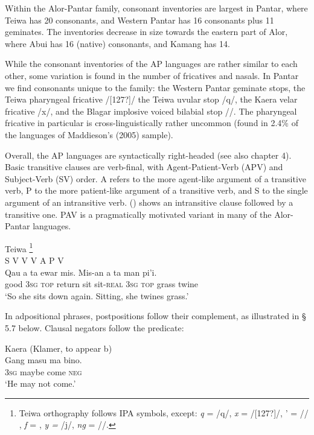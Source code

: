 Within the Alor-Pantar family, consonant inventories are largest in Pantar, where Teiwa has 20 consonants, and Western Pantar has 16 consonants plus 11 geminates. The inventories decrease in size towards the eastern part of Alor, where Abui has 16 (native) consonants, and Kamang has 14.

While the consonant inventories of the AP languages are rather similar to each other, some variation is found in the number of fricatives and nasals. In Pantar we find consonants unique to the family: the Western Pantar geminate stops, the Teiwa pharyngeal fricative /[127?]/ the Teiwa uvular stop /q/, the Kaera velar fricative /x/, and the Blagar implosive voiced bilabial stop /{\texthtb}/. The pharyngeal fricative in particular is cross-linguistically rather uncommon (found in 2.4\% of  the languages of Maddieson's (2005) sample). \nocite{Maddieson2005}

Overall, the AP languages are syntactically right-headed (see also chapter 4). Basic transitive clauses are verb-final, with Agent-Patient-Verb (APV) and Subject-Verb (SV) order. A refers to the more agent-like argument of a transitive verb, P to the more patient-like argument of a transitive verb, and S to the single argument of an intransitive verb. () shows an intransitive clause followed by a transitive one. PAV is a pragmatically motivated variant in many of the Alor-Pantar languages.


\ea%
\label{bkm:Ref336875300}
Teiwa \citep[25]{Klamer2010a}\footnote{Teiwa orthography follows IPA symbols, except: \textit{q} = /q/,\textit{ x} = /[127?]/, ' = /{\textglotstop}/ , \textit{f} = {\textphi}, \textit{y =} /j/, \textit{ng} = /{\ng}/.
}  \\
\glll {}  S  {}  V  V  V  A  {}  P  V \\
{} Qau  a  ta  ewar  mis.  Mis-an  a  ta  man  pi'i.\\
{} good  3\textsc{sg}  \textsc{top} return  sit  sit-\textsc{real} 3\textsc{sg  top} grass  twine\\
\glt  `So she sits down again. Sitting, she twines grass.'
\z








In adpositional phrases, postpositions follow their complement, as illustrated in {\S} 5.7 below. Clausal negators follow the predicate:


\ea%
\label{ex:2}
Kaera (Klamer, to appear b) \\
\gll Gang  masu  ma  bino. \\
\textsc{3sg} maybe  come  \textsc{neg} \\
\glt  `He may not come.'
\z






